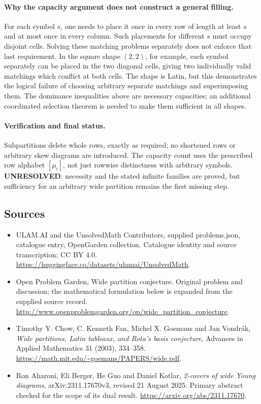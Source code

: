 \documentclass[11pt,a4paper]{article}
\begin{document}
\paragraph{Why the capacity argument does not construct a general filling.}
For each symbol $s$, one needs to place it once in every row of
length at least $s$ and at most once in every column. Such placements
for different $s$ must occupy disjoint cells. Solving these matching
problems separately does not enforce that last requirement. In the
square shape $(2,2)$, for example, each symbol separately can be
placed in the two diagonal cells, giving two individually valid
matchings which conflict at both cells. The shape is Latin, but this
demonstrates the logical failure of choosing arbitrary separate
matchings and superimposing them. The dominance inequalities above
are necessary capacities; an additional coordinated selection theorem
is needed to make them sufficient in all shapes.

\paragraph{Verification and final status.}
Subpartitions delete whole rows, exactly as required; no shortened
rows or arbitrary skew diagrams are introduced. The capacity count
uses the prescribed row alphabet $[\mu_i]$, not just rowwise
distinctness with arbitrary symbols. \textbf{UNRESOLVED}: necessity
and the stated infinite families are proved, but sufficiency for an
arbitrary wide partition remains the first missing step.

\subsection{Sources}
\begin{itemize}
\item[S1] ULAM.AI and the UnsolvedMath Contributors, supplied problems.json, catalogue entry, OpenGarden collection. Catalogue identity and source transcription; CC BY 4.0.
\url{https://huggingface.co/datasets/ulamai/UnsolvedMath}.
\item[S2] Open Problem Garden, Wide partition conjecture. Original problem and discussion; the mathematical formulation below is expanded from the supplied source record.
\url{http://www.openproblemgarden.org/op/wide_partition_conjecture}.

\item[R1] Timothy Y. Chow, C. Kenneth Fan, Michel X. Goemans and
Jan Vondr\'ak, \emph{Wide partitions, Latin tableaux, and Rota's basis
conjecture}, Advances in Applied Mathematics 31 (2003), 334--358.
\url{https://math.mit.edu/~goemans/PAPERS/wide.pdf}.
\item[R2] Ron Aharoni, Eli Berger, He Guo and Daniel Kotlar,
\emph{2-covers of wide Young diagrams}, arXiv:2311.17670v3,
revised 21 August 2025. Primary abstract checked for the scope of its
dual result.
\url{https://arxiv.org/abs/2311.17670}.

\end{itemize}
\end{document}
